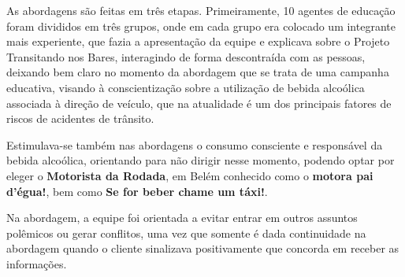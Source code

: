 \documentclass[output=paper,colorlinks,citecolor=green]{langscibook}
\begin{document}
As abordagens são feitas em três etapas. Primeiramente, 10 agentes de educação foram divididos em três grupos, onde em cada grupo era colocado um integrante mais experiente, que fazia a apresentação da equipe e explicava sobre o Projeto Transitando nos Bares, interagindo de forma descontraída com as pessoas, deixando bem claro no momento da abordagem que se trata de uma campanha educativa, visando à conscientização sobre a utilização de bebida alcoólica associada à direção de veículo, que na atualidade é um dos principais fatores de riscos de acidentes de trânsito. \vskip0.3cm

Estimulava-se também nas abordagens o consumo consciente e responsável da bebida alcoólica, orientando para não dirigir nesse momento, podendo optar por eleger o \textbf{Motorista da Rodada}, em Belém conhecido como o \textbf{motora pai d’égua!}, bem como \textbf{Se for beber chame um táxi!}.\vskip0.3cm 

Na abordagem, a equipe foi orientada a evitar entrar em outros assuntos polêmicos ou gerar conflitos, uma vez que somente é dada continuidade na abordagem quando o cliente sinalizava positivamente que concorda em receber as informações.
\end{document}
